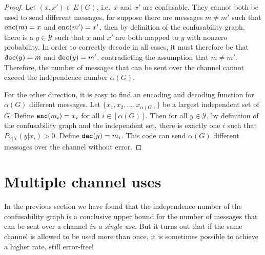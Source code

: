\begin{proof}
Let $(x,x') \in E(G)$, i.e.\ $x$ and $x'$ are confusable. They cannot both be used to send different messages, for suppose there are messages $m \neq m'$ such that $\mathtt{enc}(m) = x$ and $\mathtt{enc}(m') = x'$, then by definition of the confusability graph, there is a $y \in \mathcal{Y}$ such that $x$ and $x'$ are both mapped to $y$ with nonzero probability. In order to correctly decode in all cases, it must therefore be that $\mathtt{dec}(y) = m$ and $\mathtt{dec}(y) = m'$, contradicting the assumption that $m \neq m'$. Therefore, the number of messages that can be sent over the channel cannot exceed the independence number $\alpha(G)$.

For the other direction, it is easy to find an encoding and decoding function for $\alpha(G)$ different messages. Let $\{x_1, x_2, ..., x_{\alpha(G)}\}$ be a largest independent set of $G$. Define $\mathtt{enc}(m_i) = x_i$ for all $i \in [\alpha(G)]$. Then for all $y \in \mathcal{Y}$, by definition of the confusability graph and the independent set, there is exactly one $i$ such that $P_{Y|X}(y|x_i) > 0$. Define $\mathtt{dec}(y) = m_i$. This code can send $\alpha(G)$ different messages over the channel without error.
\end{proof}


\section{Multiple channel uses}
In the previous section we have found that the independence number of the confusability graph is a conclusive upper bound for the number of messages that can be sent over a channel \emph{in a single use}. But it turns out that if the same channel is allowed to be used more than once, it is sometimes possible to achieve a higher rate, still error-free!

